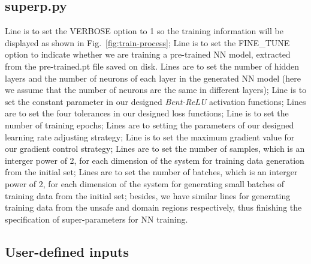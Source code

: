 \documentclass{llncs}
\begin{document}
\subsection{\textsf{superp.py}}
Line
is to set the \textsf{\small VERBOSE} option to 1 so the training information will be displayed as shown in Fig.~\ref{fig:train-process};
Line
is to set the \textsf{\small FINE\_TUNE} option to indicate whether we are training a pre-trained NN model,
extracted from the \textsf{pre-trained.pt} file saved on disk.
Lines
are to set the number of hidden layers and the number of neurons of each layer in the generated NN model (here we assume that
the number of neurons are the same in different layers);
Line
is to set the constant parameter in our designed \emph{Bent-ReLU} activation functions;
Lines
are to set the four tolerances in our designed loss functions;
Line
is to set the number of training epochs;
Lines
are to setting the parameters of our designed learning rate adjusting strategy;
Line
is to set the maximum gradient value for our gradient control strategy;
Lines
are to set the number of samples, which is an interger power of 2, for each dimension of the system for training data generation
from the initial set;
Lines
are to set the number of batches, which is an interger power of 2, for each dimension of the system for generating small batches 
of training data from the initial set; 
besides, we have similar lines for generating training data from the unsafe and
domain regions respectively, thus finishing the specification of super-parameters for NN training.

\subsection{User-defined inputs}





\end{document}
